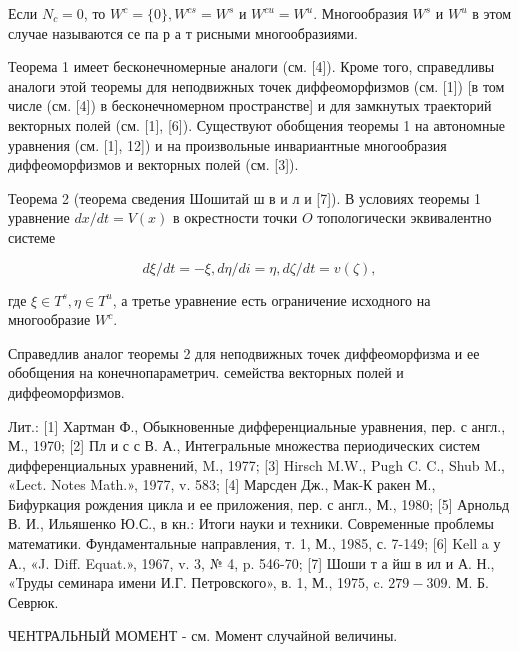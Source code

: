 \documentclass[10pt]{article}
\begin{document}
Если $N_{c}=0$, то $W^{c}=\{0\}, W^{c s}=W^{s}$ и $W^{c u}=W^{u}$. Многообразия $W^{s}$ и $W^{u}$ в этом случае называются се па р а т рисными многообразиями.



Теорема 1 имеет бесконечномерные аналоги (см. [4]). Кроме того, справедливы аналоги этой теоремы для неподвижных точек диффеоморфизмов (см. [1]) [в том числе (см. [4]) в бесконечномерном пространстве] и для замкнутых траекторий векторных полей (см. [1], [6]). Существуют обобщения теоремы 1 на автономные уравнения (см. [1], 12]) и на произвольные инвариантные многообразия диффеоморфизмов и векторных полей (см. [3]).



Теорема 2 (теорема сведения Шошитай ш в и л и [7]). В условиях теоремы 1 уравнение $d x / d t=V(x)$ в окрестности точки $O$ топологически эквивалентно системе



\[

d \xi / d t=-\xi, d \eta / d i=\eta, d \zeta / d t=v(\zeta),

\]



где $\xi \in T^{s}, \eta \in T^{u}$, а третье уравнение есть ограничение исходного на многообразие $W^{c}$.



Справедлив аналог теоремы 2 для неподвижных точек диффеоморфизма и ее обобщения на конечнопараметрич. семейства векторных полей и диффеоморфизмов.



Лит.: [1] Хартман Ф., Обыкновенные дифференциальные уравнения, пер. с англ., М., 1970; [2] Пл и с с В. А., Интегральные множества периодических систем дифференциальных уравнений, M., 1977; [3] Hirsch M.W., Pugh C. C., Shub M., «Lect. Notes Math.», 1977, v. 583; [4] Марсден Дж., Мак-К ракен М., Бифуркация рождения цикла и ее приложения, пер. с англ., М., 1980; [5] Арнольд В. И., Ильяшенко Ю.С., в кн.: Итоги науки и техники. Современные проблемы математики. Фундаментальные направления, т. 1, М., 1985, с. 7-149; [6] Kell a у А., «J. Diff. Equat.», 1967, v. 3, № 4, p. 546-70; [7] Шоши т а йш в ил и А. Н., «Труды семинара имени И.Г. Петровского», в. 1, М., 1975, c. $279-309$. М. Б. Севрюк.



ЧЕНТРАЛЬНЫЙ МОМЕНТ - см. Момент случайной величины.
\end{document}
